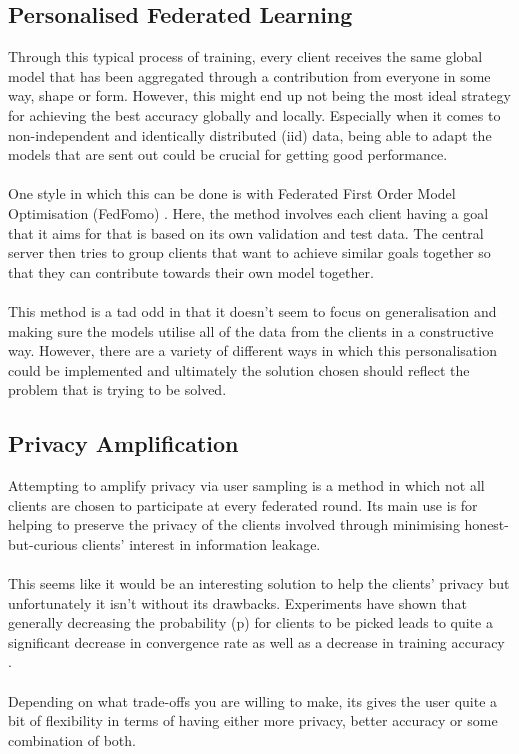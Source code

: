 \subsection{Personalised Federated Learning}
Through this typical process of training, every client receives the same global model that has been aggregated through a contribution from everyone in some way, shape or form.
However, this might end up not being the most ideal strategy for achieving the best accuracy globally and locally.
Especially when it comes to non-independent and identically distributed (iid) data, being able to adapt the models that are sent out could be crucial for getting good performance.
\\ \\
One style in which this can be done is with Federated First Order Model Optimisation (FedFomo) \cite{fedfomo}.
Here, the method involves each client having a goal that it aims for that is based on its own validation and test data.
The central server then tries to group clients that want to achieve similar goals together so that they can contribute towards their own model together.
\\ \\
This method is a tad odd in that it doesn't seem to focus on generalisation and making sure the models utilise all of the data from the clients in a constructive way.
However, there are a variety of different ways in which this personalisation could be implemented and ultimately the solution chosen should reflect the problem that is trying to be solved.


\subsection{Privacy Amplification}
Attempting to amplify privacy via user sampling is a method in which not all clients are chosen to participate at every federated round.
Its main use is for helping to preserve the privacy of the clients involved through minimising honest-but-curious clients' interest in information leakage.
\\ \\
This seems like it would be an interesting solution to help the clients' privacy but unfortunately it isn't without its drawbacks.
Experiments have shown that generally decreasing the probability (p) for clients to be picked leads to quite a significant decrease in convergence rate as well as a decrease in training accuracy \cite{privamp}.
\\ \\
Depending on what trade-offs you are willing to make, its gives the user quite a bit of flexibility in terms of having either more privacy, better accuracy or some combination of both.



